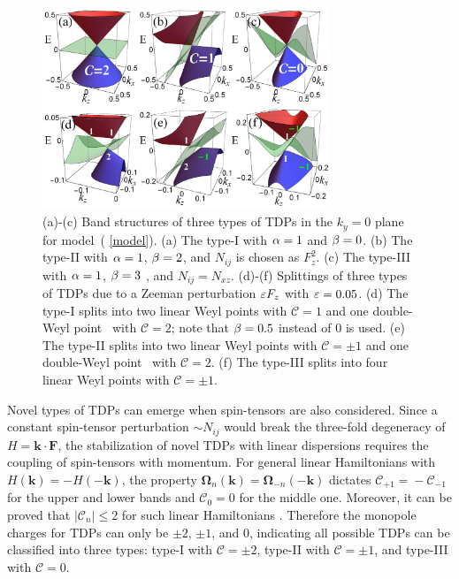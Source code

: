 \documentclass[aps,prl,floatfix,twocolumn,reprint]{revtex4}
\begin{document}
\begin{figure}[t]
\centering
\includegraphics[width=3.4in]{fig1.pdf}
\caption{(a)-(c) Band structures of three types of TDPs in the $k_{y}=0$ plane for model~(%
\protect\ref{model}). (a) The type-I with $\protect\alpha =1$ and $\protect\beta %
=0$. (b) The type-II with $\protect\alpha =1$, $\protect\beta =2$, 
and $N_{ij}$ is chosen as $F_{z}^{2}$. (c) The type-III with $\protect\alpha =1$, $\protect\beta =3$%
, and $N_{ij}=N_{xz}$. (d)-(f) Splittings of three types of TDPs due to a
Zeeman perturbation $\protect\varepsilon F_{z}$ with $\protect%
\varepsilon =0.05$. (d) The type-I splits into two linear Weyl points with $%
\mathcal{C}=1$ and one double-Weyl point~\cite{multiweyl} with $\mathcal{C}=2$; 
note that $\protect\beta =0.5$ instead of $0$ is used. (e)
The type-II splits into two linear Weyl points with $\mathcal{C}=\pm 1$ 
and one double-Weyl point~\cite{multiweyl} with $\mathcal{C}=2$. (f) The type-III splits into four linear
Weyl points with $\mathcal{C}=\pm 1$.}
\label{fig1}
\end{figure}

Novel types of TDPs can emerge when spin-tensors are also considered. Since
a constant spin-tensor perturbation $\sim N_{ij}$ would break the three-fold 
degeneracy of $H=\bm{k}\cdot \bm{F}$, the stabilization of novel TDPs 
with linear dispersions requires the coupling of spin-tensors
with momentum. For general linear Hamiltonians with $H(\bm k)=-H(-\bm k)$, 
the property $\bm{\Omega}_{n}({\bm k})=\bm{\Omega} _{-n}(-\bm k)$ dictates 
$\mathcal{C}_{+1}\!=\!-\mathcal{C}_{-1}$ for the upper and lower bands and $%
\mathcal{C}_{0}\!=\!0$ for the middle one. Moreover, it can be proved that $%
\left\vert \mathcal{C}_{n}\right\vert \leq 2$ for such linear Hamiltonians
\cite{supplementary}. Therefore the monopole charges for TDPs can only be $%
\pm 2$, $\pm 1$, and $0$, indicating all possible TDPs can be classified
into three types: type-I with $\mathcal{C}=\pm 2$, type-II with $\mathcal{C}%
=\pm 1$, and type-III with $\mathcal{C}=0$.
\end{document}
